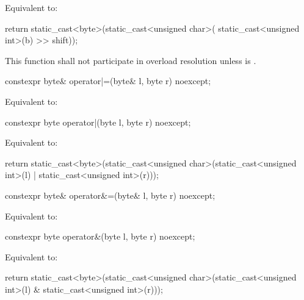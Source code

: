 \begin{itemdescr}
\pnum \effects Equivalent to:
\begin{codeblock}
return static_cast<byte>(static_cast<unsigned char>(
	                   static_cast<unsigned int>(b) >> shift));
\end{codeblock}

\pnum \remarks This function shall not participate in overload resolution unless
 is .
\end{itemdescr}

%
\begin{itemdecl}
constexpr byte& operator|=(byte& l, byte r) noexcept;
\end{itemdecl}

\begin{itemdescr}
\pnum \effects Equivalent to: 
\end{itemdescr}

%
\begin{itemdecl}
constexpr byte operator|(byte l, byte r) noexcept;
\end{itemdecl}

\begin{itemdescr}
\pnum \effects Equivalent to:
\begin{codeblock}
return static_cast<byte>(static_cast<unsigned char>(static_cast<unsigned int>(l) |
                                                    static_cast<unsigned int>(r)));
\end{codeblock}
\end{itemdescr}

%
\begin{itemdecl}
constexpr byte& operator&=(byte& l, byte r) noexcept;
\end{itemdecl}

\begin{itemdescr}
\pnum \effects Equivalent to: 
\end{itemdescr}

%
\begin{itemdecl}
constexpr byte operator&(byte l, byte r) noexcept;
\end{itemdecl}

\begin{itemdescr}
\pnum \effects Equivalent to:
\begin{codeblock}
return static_cast<byte>(static_cast<unsigned char>(static_cast<unsigned int>(l) &
                                                    static_cast<unsigned int>(r)));
\end{codeblock}
\end{itemdescr}

